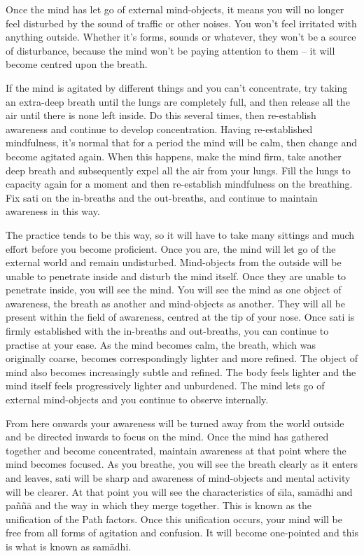 Once the mind has let go of external mind-objects, it means you will no longer feel disturbed by the sound of traffic or other noises. You won't feel irritated with anything outside. Whether it's forms, sounds or whatever, they won't be a source of disturbance, because the mind won't be paying attention to them -- it will become centred upon the breath.

If the mind is agitated by different things and you can't concentrate, try taking an extra-deep breath until the lungs are completely full, and then release all the air until there is none left inside. Do this several times, then re-establish awareness and continue to develop concentration. Having re-established mindfulness, it's normal that for a period the mind will be calm, then change and become agitated again. When this happens, make the mind firm, take another deep breath and subsequently expel all the air from your lungs. Fill the lungs to capacity again for a moment and then re-establish mindfulness on the breathing. Fix sati on the in-breaths and the out-breaths, and continue to maintain awareness in this way.

The practice tends to be this way, so it will have to take many sittings and much effort before you become proficient. Once you are, the mind will let go of the external world and remain undisturbed. Mind-objects from the outside will be unable to penetrate inside and disturb the mind itself. Once they are unable to penetrate inside, you will see the mind. You will see the mind as one object of awareness, the breath as another and mind-objects as another. They will all be present within the field of awareness, centred at the tip of your nose. Once sati is firmly established with the in-breaths and out-breaths, you can continue to practise at your ease. As the mind becomes calm, the breath, which was originally coarse, becomes correspondingly lighter and more refined. The object of mind also becomes increasingly subtle and refined. The body feels lighter and the mind itself feels progressively lighter and unburdened. The mind lets go of external mind-objects and you continue to observe internally.

From here onwards your awareness will be turned away from the world outside and be directed inwards to focus on the mind. Once the mind has gathered together and become concentrated, maintain awareness at that point where the mind becomes focused. As you breathe, you will see the breath clearly as it enters and leaves, sati will be sharp and awareness of mind-objects and mental activity will be clearer. At that point you will see the characteristics of s\={\i}la, sam\=adhi and pa\~n\~n\=a and the way in which they merge together. This is known as the unification of the Path factors. Once this unification occurs, your mind will be free from all forms of agitation and confusion. It will become one-pointed and this is what is known as sam\=adhi.

